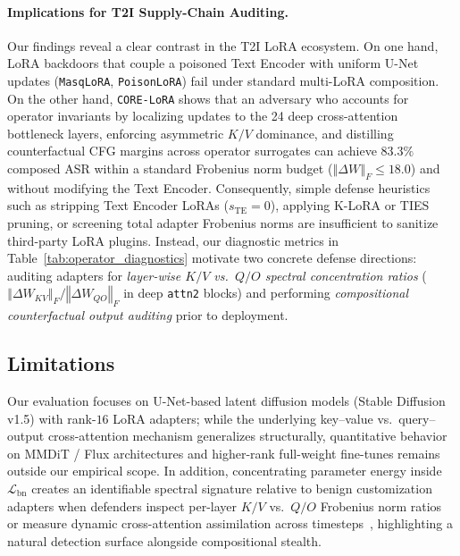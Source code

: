 \documentclass[10pt,twocolumn,letterpaper]{article}
\newcommand{\fnorm}[1]{\left\Vert #1 \right\Vert_F}
\begin{document}
\paragraph{Implications for T2I Supply-Chain Auditing.}
Our findings reveal a clear contrast in the T2I LoRA ecosystem. On one hand, LoRA backdoors that couple a poisoned Text Encoder with uniform U-Net updates (\texttt{MasqLoRA}, \texttt{PoisonLoRA}) fail under standard multi-LoRA composition. On the other hand, \texttt{CORE-LoRA} shows that an adversary who accounts for operator invariants by localizing updates to the 24 deep cross-attention bottleneck layers, enforcing asymmetric $K/V$ dominance, and distilling counterfactual CFG margins across operator surrogates can achieve $83.3\%$ composed ASR within a standard Frobenius norm budget ($\fnorm{\Delta W} \le 18.0$) and without modifying the Text Encoder. Consequently, simple defense heuristics such as stripping Text Encoder LoRAs ($s_{\text{TE}}=0$), applying K-LoRA or TIES pruning, or screening total adapter Frobenius norms are insufficient to sanitize third-party LoRA plugins. Instead, our diagnostic metrics in Table~\ref{tab:operator_diagnostics} motivate two concrete defense directions: auditing adapters for \textit{layer-wise $K/V$ vs.\ $Q/O$ spectral concentration ratios} ($\fnorm{\Delta W_{KV}} / \fnorm{\Delta W_{QO}}$ in deep \texttt{attn2} blocks) and performing \textit{compositional counterfactual output auditing} prior to deployment.

\subsection{Limitations}
\label{subsec:limitations}
Our evaluation focuses on U-Net-based latent diffusion models (Stable Diffusion v1.5) with rank-$16$ LoRA adapters; while the underlying key--value vs.\ query--output cross-attention mechanism generalizes structurally, quantitative behavior on MMDiT / Flux architectures and higher-rank full-weight fine-tunes remains outside our empirical scope. In addition, concentrating parameter energy inside $\mathcal{L}_{\text{bn}}$ creates an identifiable spectral signature relative to benign customization adapters when defenders inspect per-layer $K/V$ vs.\ $Q/O$ Frobenius norm ratios~\cite{sun2025peftguard} or measure dynamic cross-attention assimilation across timesteps~\cite{wang2024t2ishield}, highlighting a natural detection surface alongside compositional stealth.
\end{document}
